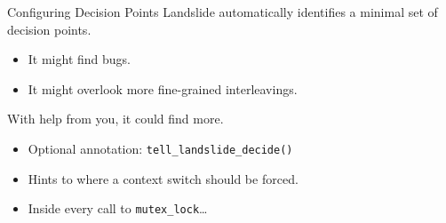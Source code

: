 \documentclass[xcolor=dvipsnames]{beamer}
\begin{document}
\begin{frame}{Configuring Decision Points}
	Landslide automatically identifies a minimal set of decision points.
	\begin{itemize}
		\item It might find bugs.
		\item It might overlook more fine-grained interleavings.
	\end{itemize}
	With help from you, it could find more.
	\begin{itemize}
		\item Optional annotation: \texttt{tell\_landslide\_decide()}
		\item Hints to where a context switch should be forced.
		\item Inside every call to \texttt{mutex\_lock}\ldots
	\end{itemize}
\end{frame}



%
\end{document}
